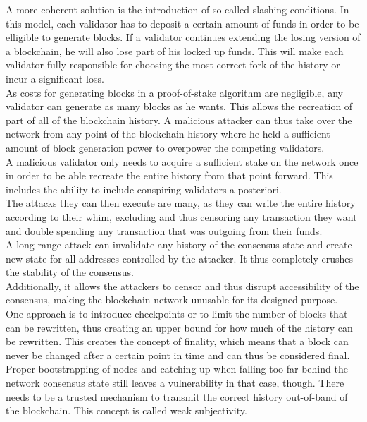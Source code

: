 \documentclass[11pt,a4paper,draft]{article}
\begin{document}
A more coherent solution is the introduction of so-called slashing conditions. In this model, each validator has to deposit a certain amount of funds in order to be elligible to generate blocks. If a validator continues extending the losing version of a blockchain, he will also lose part of his locked up funds. This will make each validator fully responsible for choosing the most correct fork of the history or incur a significant loss.\\

As costs for generating blocks in a proof-of-stake algorithm are negligible, any validator can generate as many blocks as he wants. This allows the recreation of part of all of the blockchain history. A malicious attacker can thus take over the network from any point of the blockchain history where he held a sufficient amount of block generation power to overpower the competing validators.\\

A malicious validator only needs to acquire a sufficient stake on the network once in order to be able recreate the entire history from that point forward. This includes the ability to include conspiring validators a posteriori.\\

The attacks they can then execute are many, as they can write the entire history according to their whim, excluding and thus censoring any transaction they want and double spending any transaction that was outgoing from their funds.\\

A long range attack can invalidate any history of the consensus state and create new state for all addresses controlled by the attacker. It thus completely crushes the stability of the consensus.\\

Additionally, it allows the attackers to censor and thus disrupt accessibility of the consensus, making the blockchain network unusable for its designed purpose.\\

One approach is to introduce checkpoints or to limit the number of blocks that can be rewritten, thus creating an upper bound for how much of the history can be rewritten. This creates the concept of finality, which means that a block can never be changed after a certain point in time and can thus be considered final.\\

Proper bootstrapping of nodes and catching up when falling too far behind the network consensus state still leaves a vulnerability in that case, though. There needs to be a trusted mechanism to transmit the correct history out-of-band of the blockchain. This concept is called weak subjectivity.\\
\end{document}
